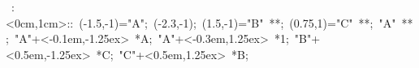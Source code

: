 

\hbox{
\xy    <1cm,0cm>:<0cm,1cm>::
       (-1.5,-1)="A"; (-2.3,-1); (1.5,-1)="B" **\dir{-}; 
       (0.75,1)="C" **\dir{-}; "A" **\dir{-};
       "A"+<-0.1em,-1.25ex> *{A}; 
       "A"+<-0.3em,1.25ex> *{1}; 
       "B"+<0.5em,-1.25ex> *{C}; 
       "C"+<0.5em,1.25ex> *{B}; 
\endxy}
